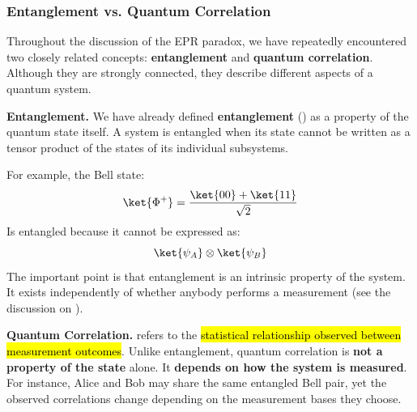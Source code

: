 \subsubsection{Entanglement vs. Quantum Correlation}\label{sec:entanglement-vs-quantum-correlation}

Throughout the discussion of the EPR paradox, we have repeatedly encountered two closely related concepts: \textbf{entanglement} and \textbf{quantum correlation}. Although they are strongly connected, they describe different aspects of a quantum system.

\highspace
\textcolor{Green3}{ \textbf{Entanglement.}} We have already defined \textbf{entanglement} () as a property of the quantum state itself. A system is entangled when its state cannot be written as a tensor product of the states of its individual subsystems.

\highspace
For example, the Bell state:
\begin{equation*}
    \ket{\Phi^+}
    =
    \frac{\ket{00}+\ket{11}}{\sqrt{2}}
\end{equation*}
Is entangled because it cannot be expressed as:
\begin{equation*}
    \ket{\psi_A}\otimes\ket{\psi_B}
\end{equation*}
The important point is that entanglement is an intrinsic property of the system. It exists independently of whether anybody performs a measurement (see the discussion on ).

\highspace
\textcolor{Green3}{ \textbf{Quantum Correlation.}}  refers to the \hl{statistical relationship observed between measurement outcomes}. Unlike entanglement, quantum correlation is \textbf{not a property of the state} alone. It \textbf{depends on how the system is measured}. For instance, Alice and Bob may share the same entangled Bell pair, yet the observed correlations change depending on the measurement bases they choose.

